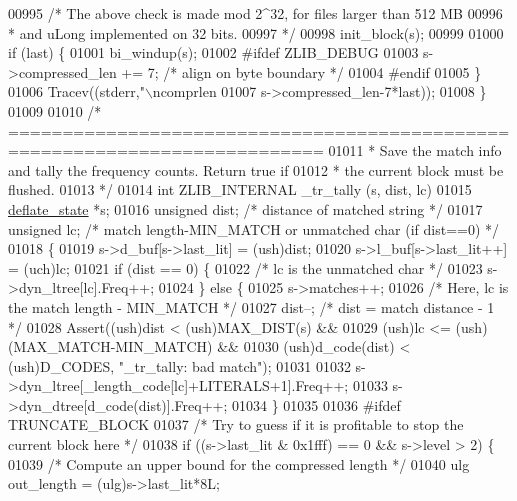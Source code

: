 \begin{DoxyCode}
{{{{{{{{{{{{{{{{{{{{{00995     \textcolor{comment}{/* The above check is made mod 2^32, for files larger than 512 MB}
00996 \textcolor{comment}{     * and uLong implemented on 32 bits.}
00997 \textcolor{comment}{     */}
00998     init\_block(s);
00999 
01000     \textcolor{keywordflow}{if} (last) \{
01001         bi\_windup(s);
01002 \textcolor{preprocessor}{#ifdef ZLIB\_DEBUG}
01003         s->compressed\_len += 7;  \textcolor{comment}{/* align on byte boundary */}
01004 \textcolor{preprocessor}{#endif}
01005     \}
01006     Tracev((stderr,\textcolor{stringliteral}{"\(\backslash\)ncomprlen %
01007            s->compressed\_len-7*last));
01008 \}
01009 
01010 \textcolor{comment}{/* ===========================================================================}
01011 \textcolor{comment}{ * Save the match info and tally the frequency counts. Return true if}
01012 \textcolor{comment}{ * the current block must be flushed.}
01013 \textcolor{comment}{ */}
01014 \textcolor{keywordtype}{int} ZLIB\_INTERNAL \_tr\_tally (s, dist, lc)
01015     \hyperlink{structinternal__state}{deflate\_state} *s;
01016     \textcolor{keywordtype}{unsigned} dist;  \textcolor{comment}{/* distance of matched string */}
01017     \textcolor{keywordtype}{unsigned} lc;    \textcolor{comment}{/* match length-MIN\_MATCH or unmatched char (if dist==0) */}
01018 \{
01019     s->d\_buf[s->last\_lit] = (ush)dist;
01020     s->l\_buf[s->last\_lit++] = (uch)lc;
01021     \textcolor{keywordflow}{if} (dist == 0) \{
01022         \textcolor{comment}{/* lc is the unmatched char */}
01023         s->dyn\_ltree[lc].Freq++;
01024     \} \textcolor{keywordflow}{else} \{
01025         s->matches++;
01026         \textcolor{comment}{/* Here, lc is the match length - MIN\_MATCH */}
01027         dist--;             \textcolor{comment}{/* dist = match distance - 1 */}
01028         Assert((ush)dist < (ush)MAX\_DIST(s) &&
01029                (ush)lc <= (ush)(MAX\_MATCH-MIN\_MATCH) &&
01030                (ush)d\_code(dist) < (ush)D\_CODES,  \textcolor{stringliteral}{"\_tr\_tally: bad match"});
01031 
01032         s->dyn\_ltree[\_length\_code[lc]+LITERALS+1].Freq++;
01033         s->dyn\_dtree[d\_code(dist)].Freq++;
01034     \}
01035 
01036 \textcolor{preprocessor}{#ifdef TRUNCATE\_BLOCK}
01037     \textcolor{comment}{/* Try to guess if it is profitable to stop the current block here */}
01038     \textcolor{keywordflow}{if} ((s->last\_lit & 0x1fff) == 0 && s->level > 2) \{
01039         \textcolor{comment}{/* Compute an upper bound for the compressed length */}
01040         ulg out\_length = (ulg)s->last\_lit*8L;
}}}}}}}}}}}}}}}}}}}}}}
\end{DoxyCode}
